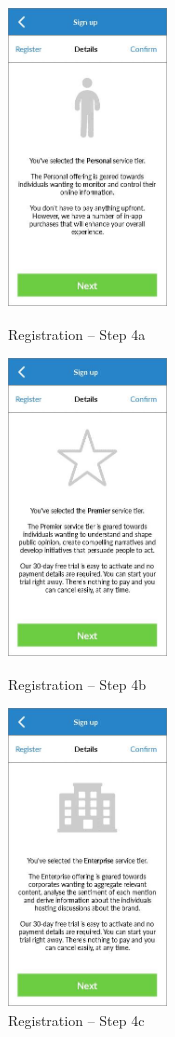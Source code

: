 \begin{figure}
  \subfigures
  \centering
  \begin{minipage}{4.6cm}
    \centering
    \includegraphics[width=4.2cm]{inc/ui_reg_step4a.jpg}
    \caption{Registration -- Step 4a}
    \label{fig:ui_reg_step4a}
  \end{minipage}
  \begin{minipage}{4.6cm}
    \centering
    \includegraphics[width=4.2cm]{inc/ui_reg_step4b.jpg}
    \caption{Registration -- Step 4b}
    \label{fig:ui_reg_step4b}
  \end{minipage}
  \begin{minipage}{4.6cm}
    \centering
    \includegraphics[width=4.2cm]{inc/ui_reg_step4c.jpg}
    \caption{Registration -- Step 4c}
    \label{fig:ui_reg_step4c}
  \end{minipage}
\end{figure}

